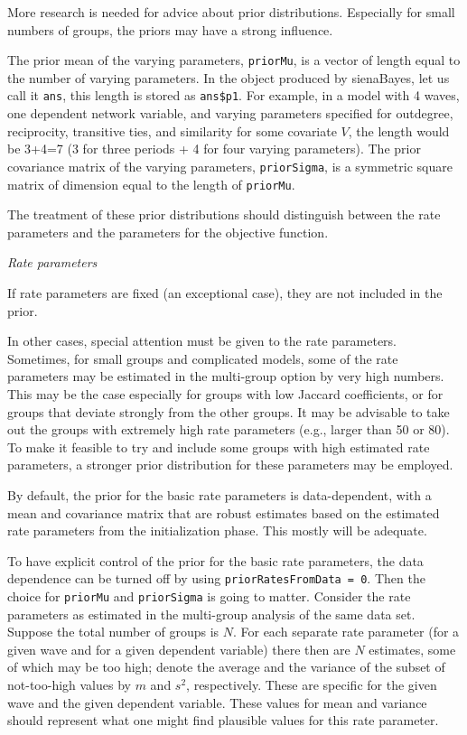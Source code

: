 \documentclass[a4paper,fleqn,11pt]{article}
\newcommand{\+}{\, + \,}
\begin{document}
More research is needed for advice about prior distributions.
Especially for small numbers of groups, the priors may have a strong influence.
\medskip

The prior mean of the varying parameters,
\texttt{priorMu}, is a vector of length equal to the number of varying parameters.
In the object produced by \textsf{sienaBayes}, let us call it \texttt{ans},
this length is stored as \texttt{ans\$p1}.
For example, in a model with 4 waves, one dependent network variable,
and varying parameters specified for outdegree, reciprocity,
transitive ties, and similarity for some covariate $V$,
the length would be 3+4=7 (3 for three periods +
4 for four varying parameters).
The prior covariance matrix of the varying parameters,
\texttt{priorSigma}, is a symmetric square matrix of dimension
equal to the length of \texttt{priorMu}.

The treatment of these prior distributions
should distinguish between the rate parameters and the parameters for the
objective function.
\medskip

\noindent
\emph{Rate parameters}
\smallskip

\noindent
If rate parameters are fixed (an exceptional case), they are
not included in the prior.

In other cases, special attention must be given to the rate parameters.
Sometimes, for small groups and complicated models, some of the
rate parameters may be estimated in the multi-group option by very high
numbers. This may be the case especially for groups with low Jaccard
coefficients, or for groups that deviate strongly from the other groups.
It may be advisable to take out the groups with extremely high
rate parameters (e.g., larger than 50 or 80).
To make it feasible to try and include some groups with high estimated rate
parameters, a stronger prior distribution for these parameters may be employed.

By default, the prior for the basic rate parameters is data-dependent,
with a mean and covariance matrix that are robust estimates
based on the estimated rate parameters from the initialization phase.
This mostly will be adequate.

To have explicit control of the prior for the basic rate parameters,
the data dependence can be turned off by using
\texttt{priorRatesFromData = 0}.
Then the choice for \texttt{priorMu} and \texttt{priorSigma}
is going to matter.
Consider the rate parameters as estimated in the multi-group analysis
of the same data set.
Suppose the total number of groups is $N$.
For each separate rate parameter (for a given wave
and for a given dependent variable) there then are $N$ estimates,
some of which may be too high; denote the average and the variance
of the subset of not-too-high values by $m$ and $s^2$, respectively.
These are specific for the  given wave and the given dependent variable.
These values for mean and variance should
represent what one might find plausible values for this rate parameter.
\end{document}
